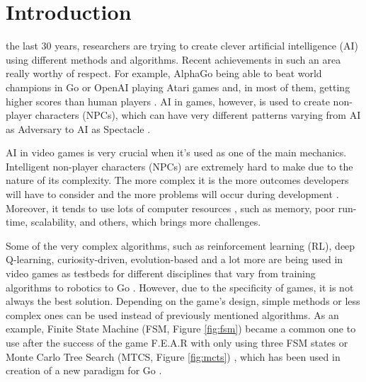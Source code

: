 \documentclass[journal]{IEEEtran}
\begin{document}
\section{Introduction}
% 
% 
% 
% 
 the last 30 years, researchers are trying to create clever artificial intelligence (AI) using different methods and algorithms. Recent achievements in such an area really worthy of respect. For example, AlphaGo being able to beat world champions in Go \cite{alphago} or OpenAI playing Atari games and, in most of them, getting higher scores than human players \cite{mnih2015human}. AI in games, however, is used to create non-player characters (NPCs), which can have very different patterns varying from AI as Adversary to AI as Spectacle \cite{treanor2015ai}. 

AI in video games is very crucial when it's used as one of the main mechanics. Intelligent non-player characters (NPCs) are extremely hard to make due to the nature of its complexity. The more complex it is the more outcomes developers will have to consider and the more problems will occur during development \cite{gdchalo2}. Moreover, it tends to use lots of computer resources \cite{gdchalo2}, such as memory, poor run-time, scalability, and others, which brings more challenges.

Some of the very complex algorithms, such as reinforcement learning (RL), deep Q-learning, curiosity-driven, evolution-based and a lot more are being used in video games as testbeds for different disciplines that vary from training algorithms \cite{aiinvideogames}\cite{robotplayground} to robotics \cite{schmidhuber2006developmental}\cite{colledanchise2018behavior}\cite{brady1985artificial}\cite{oudeyer2004intelligent} to Go \cite{schaul2011measuring}\cite{alphago}. However, due to the specificity of games, it is not always the best solution. Depending on the game's design, simple methods or less complex ones can be used instead of previously mentioned algorithms. As an example, Finite State Machine (FSM, Figure \ref{fig:fsm}) became a common one to use after the success of the game F.E.A.R with only using three FSM states \cite{orkin2006three} or Monte Carlo Tree Search (MTCS, Figure \ref{fig:mcts}) \cite{chaslot2008monte}, which has been used in creation of a new paradigm for Go \cite{gelly2011monte}\cite{gelly2012grand}. %
\end{document}
